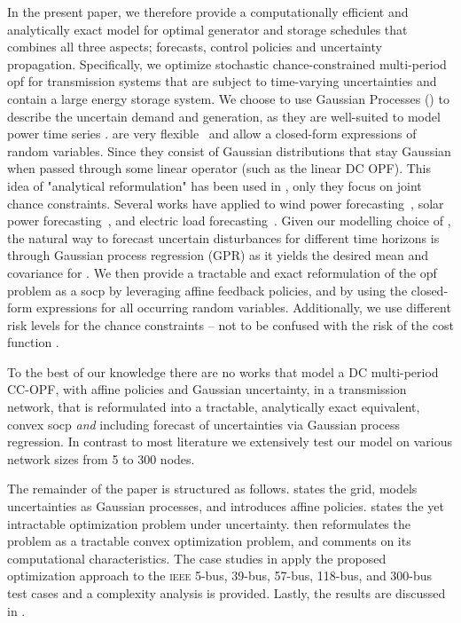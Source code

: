 \documentclass[final,3p,times,twocolumn]{elsarticle}  %
\begin{document}
In the present paper, we therefore provide a computationally efficient and analytically exact model for optimal generator and storage schedules that combines all three aspects; forecasts, control policies and uncertainty propagation. Specifically, we optimize stochastic chance-constrained multi-period \gls{opf} for transmission systems that are subject to time-varying uncertainties and contain a large energy storage system. We choose to use Gaussian Processes (\gps) to describe the uncertain demand and generation, as they are well-suited to model power time series \cite{mitrentsis_probabilistic_2021}. \gps are very flexible~\cite{Roberts12} and allow a closed-form expressions of random variables. Since they consist of Gaussian distributions that stay Gaussian when passed through some linear operator (such as the linear DC OPF). This idea of "analytical reformulation" has been used in \cite{Li17}, only they focus on joint chance constraints. Several works have applied \gps to wind power forecasting~\cite{Kou13,Chen14}, solar power forecasting~\cite{Sheng18}, and electric load forecasting~\cite{Mori08,Leith04,Lloyd14,Rogers11,Blum13,McLoughlin13}. Given our modelling choice of \gps, the natural way to forecast uncertain disturbances for different time horizons is through Gaussian process regression (GPR) \cite{Rasmussen06} as it yields the desired mean and covariance for \gps. We then provide a tractable and exact reformulation of the \gls{opf} problem as a \gls{socp} by leveraging affine feedback policies, and by using the closed-form expressions for all occurring random variables. Additionally, we use different risk levels for the chance constraints -- not to be confused with the risk of the cost function \cite{hemmati_stochastic_2016}.

To the best of our knowledge there are no works that model a DC multi-period CC-OPF, with affine policies and Gaussian uncertainty, in a transmission network, that is reformulated into a tractable, analytically exact equivalent, convex \gls{socp} \emph{and} including forecast of uncertainties via Gaussian process regression. In contrast to most literature we extensively test our model on various network sizes from 5 to 300 nodes.

The remainder of the paper is structured as follows.  states the grid, models uncertainties as Gaussian processes, and introduces affine policies.  states the yet intractable optimization problem under uncertainty.  then reformulates the \opf problem as a tractable convex optimization problem, and comments on its computational characteristics. The case studies in  apply the proposed optimization approach to the \textsc{ieee} 5-bus, 39-bus, 57-bus, 118-bus, and 300-bus test cases and a complexity analysis is provided. Lastly, the results are discussed in .
\end{document}
